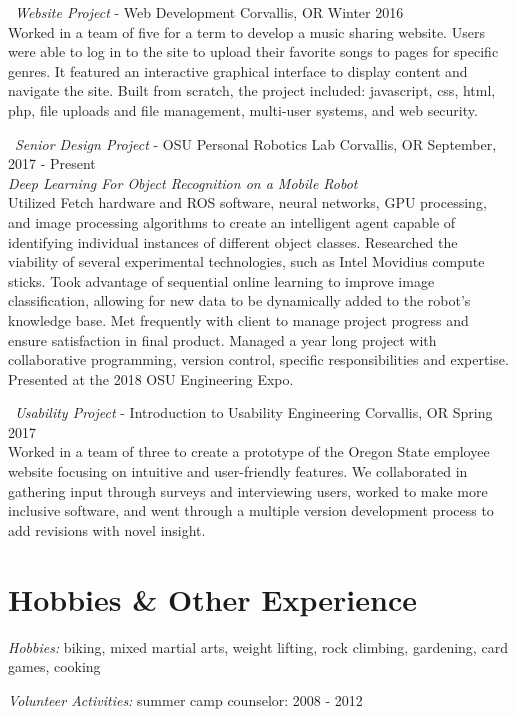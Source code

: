 \documentclass{res}
\begin{document}
\begin{resume}
\textbullet \ {\sl Website Project} - Web Development \hfill  Corvallis, OR Winter 2016\\
Worked in a team of five for a term to develop a music sharing website. Users were able to log in to the site to upload their favorite songs to pages for specific genres. It featured an interactive graphical interface to display content and navigate the site. Built from scratch, the project included: javascript, css, html, php, file uploads and file management, multi-user systems, and web security.  

\textbullet \ {\sl Senior Design Project} - OSU Personal Robotics Lab \hfill Corvallis, OR September, 2017 - Present \\
{\sl Deep Learning For Object Recognition on a Mobile Robot} \\
Utilized Fetch hardware and ROS software, neural networks, GPU processing, and image processing algorithms to create an intelligent agent capable of identifying individual instances of different object classes. Researched the viability of several experimental technologies, such as Intel Movidius compute sticks. Took advantage of sequential online learning to improve image classification, allowing for new data to be dynamically added to the robot's knowledge base. Met frequently with client to manage project progress and ensure satisfaction in final product. Managed a year long project with collaborative programming, version control, specific responsibilities and expertise. Presented at the 2018 OSU Engineering Expo. 

\textbullet \ {\sl Usability Project} - Introduction to Usability Engineering \hfill Corvallis, OR Spring 2017 \\
Worked in a team of three to create a prototype of the Oregon State employee website focusing on intuitive and user-friendly features. We collaborated in gathering input through surveys and interviewing users, worked to make more inclusive software, and went through a multiple version development process to add revisions with novel insight. 

\section{\bf\large  Hobbies \& Other Experience}
{\it Hobbies:} biking, mixed martial arts, weight lifting, rock climbing, gardening, card games, cooking

{\it Volunteer Activities:} summer camp counselor: 2008 - 2012
\end{resume}
\vfill %
\end{document}
